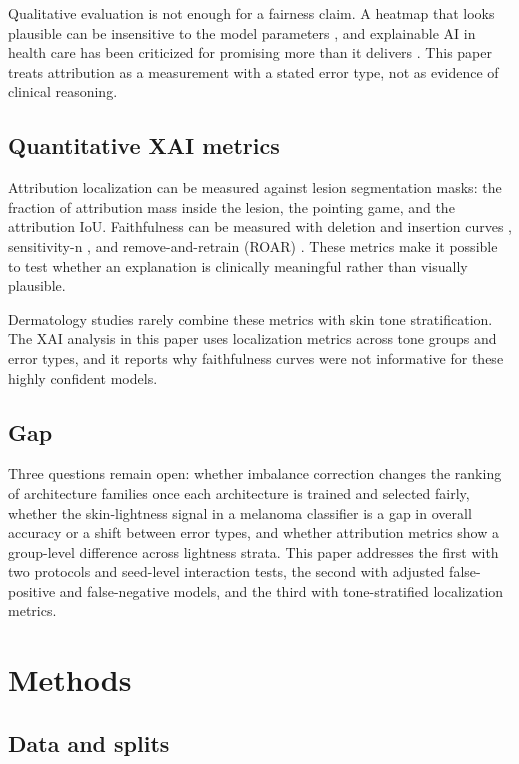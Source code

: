 \documentclass[11pt]{article}
\begin{document}
Qualitative evaluation is not enough for a fairness claim. A heatmap that looks plausible can be insensitive to the model parameters \citep{adebayo2018sanity}, and explainable AI in health care has been criticized for promising more than it delivers \citep{ghassemi2021falsehope}. This paper treats attribution as a measurement with a stated error type, not as evidence of clinical reasoning.

\subsection{Quantitative XAI metrics}

Attribution localization can be measured against lesion segmentation masks: the fraction of attribution mass inside the lesion, the pointing game, and the attribution IoU. Faithfulness can be measured with deletion and insertion curves \citep{petsiuk2018rise}, sensitivity-n \citep{samek2017evaluating}, and remove-and-retrain (ROAR) \citep{hooker2019benchmark}. These metrics make it possible to test whether an explanation is clinically meaningful rather than visually plausible.

Dermatology studies rarely combine these metrics with skin tone stratification. The XAI analysis in this paper uses localization metrics across tone groups and error types, and it reports why faithfulness curves were not informative for these highly confident models.

\subsection{Gap}

Three questions remain open: whether imbalance correction changes the ranking of architecture families once each architecture is trained and selected fairly, whether the skin-lightness signal in a melanoma classifier is a gap in overall accuracy or a shift between error types, and whether attribution metrics show a group-level difference across lightness strata. This paper addresses the first with two protocols and seed-level interaction tests, the second with adjusted false-positive and false-negative models, and the third with tone-stratified localization metrics.

\section{Methods}

\subsection{Data and splits}
\end{document}
